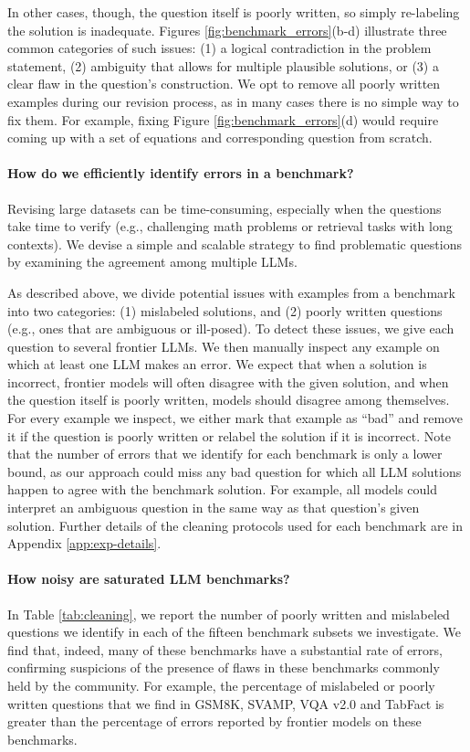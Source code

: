 In other cases, though, the question itself is poorly written, so simply re-labeling the solution is inadequate. Figures \ref{fig:benchmark_errors}(b-d) illustrate three common categories of such issues: (1) a logical contradiction in the problem statement, (2) ambiguity that allows for multiple plausible solutions, or (3) a clear flaw in the question's construction. 
We opt to remove all poorly written examples during our revision process, as in many cases there is no simple way to fix them. For example, fixing Figure \ref{fig:benchmark_errors}(d) would require coming up with a set of equations and corresponding question from scratch.

\paragraph{How do we efficiently identify errors in a benchmark?} 

Revising large datasets can be time-consuming, especially when the questions take time to verify (e.g., challenging math problems or retrieval tasks with long contexts). We devise a simple and scalable strategy to find problematic questions by examining the agreement among multiple LLMs.

As described above, we divide potential issues with examples from a benchmark into two categories: (1) mislabeled solutions, and (2) poorly written questions (e.g., ones that are ambiguous or ill-posed). To detect these issues, we give each question to several frontier LLMs. We then manually inspect any example on which at least one LLM makes an error. We expect that when a solution is incorrect, frontier models will often disagree with the given solution, and when the question itself is poorly written, models should disagree among themselves. For every example we inspect, we either mark that example as ``bad'' and remove it if the question is poorly written or relabel the solution if it is incorrect. 
Note that the number of errors that we identify for each benchmark is only a lower bound, as our approach could miss any bad question for which all LLM solutions happen to agree with the benchmark solution. For example, all models could interpret an ambiguous question in the same way as that question's given solution. Further details of the cleaning protocols used for each benchmark are in Appendix \ref{app:exp-details}.


\paragraph{How noisy are saturated LLM benchmarks?}
In Table \ref{tab:cleaning}, we report the number of poorly written and mislabeled questions we identify in each of the fifteen benchmark subsets we investigate. We find that, indeed, many of these benchmarks have a substantial rate of errors, confirming suspicions of the presence of flaws in these benchmarks commonly held by the community. For example, the percentage of mislabeled or poorly written questions that we find in GSM8K, SVAMP, VQA v2.0 and TabFact is greater than the percentage of errors reported by frontier models on these benchmarks.


